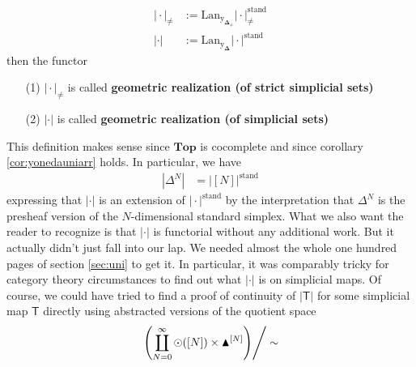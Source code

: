 \begin{align*}
  \vert
    \cdot
  \vert_{\neq}
  &:=
  \mathrm{Lan}_{\mathrm{y_{\mathbf{\Delta}_{\neq}}}}
  \vert
    \cdot
  \vert_{\neq}^{\textrm{stand}}
  \\
  \vert
    \cdot
  \vert
  &:=
  \mathrm{Lan}_{\mathrm{y_{\mathbf{\Delta}}}}
  \vert
    \cdot
  \vert^{\textrm{stand}}
\end{align*}
then the functor
\begin{enumerate}
\item[(1)]
$\vert \cdot \vert_{\neq}$ is called \textbf{geometric realization (of strict simplicial sets)}
\item[(2)]
$\vert \cdot \vert$ is called \textbf{geometric realization (of simplicial sets)}
\end{enumerate}
This definition makes sense since $\mathbf{Top}$ is cocomplete and since corollary \ref{cor:yonedauniarr} holds. In particular, we have
\begin{align*}
  \left\vert
    \Delta^{N}
  \right\vert
  &=
  \left\vert
    [N]
  \right\vert^{\textrm{stand}}
\end{align*}
expressing that $\vert \cdot \vert$ is an extension of $\vert \cdot \vert^{\textrm{stand}}$ by the interpretation that $\Delta^{N}$ is the presheaf version of the $N$-dimensional standard simplex. What we also want the reader to recognize is that $\vert \cdot \vert$ is functorial without any additional work. But it actually didn't just fall into our lap. We needed almost the whole one hundred pages of section \ref{sec:uni} to get it. In particular, it was comparably tricky for category theory circumstances to find out what $\vert \cdot \vert$ is on simplicial maps. Of course, we could have tried to find a proof of continuity of $\vert \mathsf{T} \vert$ for some simplicial map $\mathsf{T}$ directly using abstracted versions of the quotient space
\begin{align*}
  \left.
    \left(
      \coprod_{N=0}^{\infty}
      \odot([N])
      \times
      \blacktriangle^{[N]}
    \right)
  \right\slash
  \sim
\end{align*}
